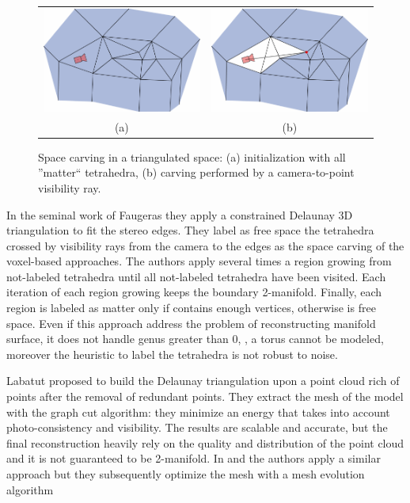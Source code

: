 \begin{figure}[t]
 \begin{tabular}{cc}
  \includegraphics[width=0.47\columnwidth]{./img/ch_soa/spaceCarving01}&
  \includegraphics[width=0.47\columnwidth]{./img/ch_soa/spaceCarving02}\\
  (a) & (b)\\
 \end{tabular}
 \caption{Space carving in a triangulated space: (a) initialization with all ''matter`` tetrahedra, (b) carving performed by a camera-to-point visibility ray.}
 \label{fig:spacecarving}
\end{figure}


In the seminal work of Faugeras \etal \cite{faugeras_et_al_90} they apply a constrained Delaunay 3D triangulation to fit the stereo edges. They label  as free space the tetrahedra crossed by visibility rays from the camera to the edges as the space carving of the voxel-based approaches. The authors apply several times a region growing from not-labeled tetrahedra  until all not-labeled tetrahedra have been visited. Each iteration of each region growing keeps the boundary 2-manifold. Finally, each region is labeled as matter only if contains enough vertices, otherwise is free space. 
Even if this approach address the problem of reconstructing manifold surface, it does not handle genus greater than 0, \eg, a torus cannot be modeled, moreover the heuristic to label the tetrahedra is not robust to noise.


Labatut \etal \cite{labatut2007efficient} proposed to build the Delaunay triangulation upon a point cloud rich of points after the removal of redundant points. 
They extract the mesh of the model with the graph cut algorithm: they minimize an energy that takes into account photo-consistency and visibility. The results are scalable and accurate, but the final reconstruction heavily rely on the quality and distribution of the point cloud and it is not guaranteed to be 2-manifold.
In \cite{hiep2009towards} and \cite{vu_et_al_2012} the authors apply a similar approach but they subsequently optimize the mesh with a mesh evolution algorithm

